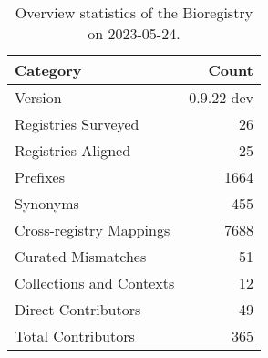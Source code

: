 \begin{table}
\caption{Overview statistics of the Bioregistry on 2023-05-24.}
\label{tab:bioregistry-summary}
\begin{tabular}{lr}
\toprule
Category & Count \\
\midrule
Version & 0.9.22-dev \\
Registries Surveyed & 26 \\
Registries Aligned & 25 \\
Prefixes & 1664 \\
Synonyms & 455 \\
Cross-registry Mappings & 7688 \\
Curated Mismatches & 51 \\
Collections and Contexts & 12 \\
Direct Contributors & 49 \\
Total Contributors & 365 \\
\bottomrule
\end{tabular}
\end{table}
